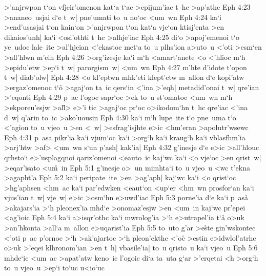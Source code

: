 >'anjrwpon
t`on
vfjeir'omenon
kat`a
t`ac
>epijum'iac
t~hc
>ap'athc\bibvsend
\vs Eph 4:23
>ananeo~usjai
d`e
t~w|
pne'umati
to~u
no`oc
<um~wn\bibvsend
\vs Eph 4:24
ka`i
>end'usasjai
t`on
kain`on
>'anjrwpon
t`on
kat`a
vje`on
ktisj'enta
>en
dikaios'unh|
ka`i
<osi'othti
t~hc
>alhje'iac\bibvsend
\vs Eph 4:25
di`o
>apoj'emenoi
t`o
ye~udoc
lale~ite
>al'hjeian
<'ekastoc
met`a
to~u
plhs'ion
a>uto~u
<'oti
>esm`en
>all'hlwn
m'elh\bibvsend
\vs Eph 4:26
>org'izesje
ka`i
m`h
<amart'anete
<o
<'hlioc
m`h
>epidu'etw
>ep`i
t~w|
parorgism~w|
<um~wn\bibvsend
\vs Eph 4:27
m'h\r{t}e
d'idote
t'opon
t~w|
diab'olw|\bibvsend
\vs Eph 4:28
<o
kl'eptwn
mhk'eti
klept'etw
m~allon
d`e
kopi'atw
>ergaz'omenoc
t`o\r{}
>agaj`on
ta~ic
qers`in
<'ina
>'eqh|
metadid'onai
t~w|
qre'ian
>'eqonti\bibvsend
\vs Eph 4:29
p~ac
l'ogoc
sapr`oc
>ek
to~u
st'omatoc
<um~wn
m`h
>ekporeu'esjw
>al\r{l}>
e>'i
tic
>agaj`oc
pr`oc
o>ikodom`hn
t~hc
qre'iac
<'ina
d~w|
q'arin
to~ic
>ako'uousin\bibvsend
\vs Eph 4:30
ka`i
m`h
lupe~ite
t`o
pne~uma
t`o
<'agion
to~u
vjeo~u
>en
<~w|
>esfrag'isjhte
e>ic
<hm'eran
>apolutr'wsewc\bibvsend
\vs Eph 4:31
p~asa
pikr'ia
ka`i
vjum`oc
ka`i
>org`h
ka`i
kraug`h
ka`i
vblasfhm'ia
>arj'htw
>af>
<um~wn
s`un
p'ash|
kak'ia|\bibvsend
\vs Eph 4:32
g'inesje
d`e
e>ic
>all'hlouc
qrhsto`i
e>'usplagqnoi
qariz'omenoi
<eauto~ic
kaj`wc
ka`i
<o
vje`oc
>en
qrist~w|
>eqar'isato
<u\r{m}~in\bibvsend
{}
\vs Eph 5:1
g'inesje
o>~un
mimhta`i
to~u
vjeo~u
<wc
t'ekna
>agapht'a\bibvsend
\vs Eph 5:2
ka`i
peripate~ite
>en
>ag'aph|
kaj`wc
ka`i
<o
qrist`oc
>hg'aphsen
<hm~ac
ka`i
par'edwken
<eaut`on
<up`er
<hm~wn
prosfor`an
ka`i
vjus'ian
t~w|
vje~w|
e>ic
>osm`hn
e>uwd'iac\bibvsend
\vs Eph 5:3
porne'ia
d`e
ka`i
p~asa\r{}
>akajars'ia
>`h
pleonex'ia
mhd`e
>onomaz'esjw
>en
<um~in
kaj`wc
pr'epei
<ag'ioic\bibvsend
\vs Eph 5:4
ka`i
a>isqr'othc
ka`i
mwrolog'ia
>`h
e>utrapel'ia
t`a\r{}
o>uk
>an'hkonta
>all`a
m~allon
e>uqarist'ia\bibvsend
\vs Eph 5:5
to~uto
g'ar
>e\r{s}te
gin'wskontec
<'oti
p~ac
p'ornoc
>`h
>ak'ajartoc
>`h
pleon'ekthc
<'o\r{c}
>estin
e>idwlol'atrhc
o>uk
>'eqei
klhronom'ian
>en
t~h|
vbasile'ia|
to~u
qristo~u
ka`i
vjeo~u\bibvsend
\vs Eph 5:6
mhde`ic
<um~ac
>apat'atw
keno~ic
l'ogoic
di`a
ta~uta
g`ar
>'erqetai
<h
>org`h
to~u
vjeo~u
>ep`i
to`uc
u<io`uc
